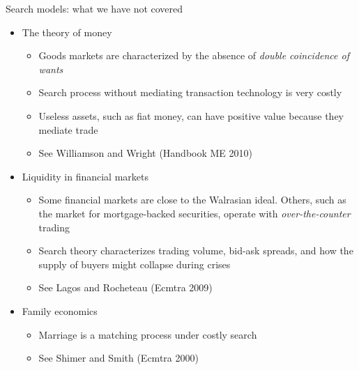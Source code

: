 \documentclass[9pt]{beamer}
\newcommand{\bit}{\begin{itemize}}
\newcommand{\eit}{\end{itemize}}
\begin{document}
\begin{frame}{Search models: what we have not covered}

\bit
\setlength\itemsep{1.5em}

\item The theory of money
\bit
\setlength\itemsep{0.5em}
\item Goods markets are characterized by the absence of \emph{double coincidence of wants}
\item Search process without mediating transaction technology is very costly
\item Useless assets, such as fiat money, can have positive value because they mediate trade
\item See Williamson and Wright (Handbook ME 2010)
\eit

\item Liquidity in financial markets
\bit
\setlength\itemsep{0.5em}
\item Some financial markets are close to the Walrasian ideal. Others, such as the market for mortgage-backed securities, operate with \emph{over-the-counter} trading
\item Search theory characterizes trading volume, bid-ask spreads, and how the supply of buyers might collapse during crises
\item See Lagos and Rocheteau (Ecmtra 2009)
\eit

\item Family economics
\bit
\setlength\itemsep{0.5em}
\item Marriage is a matching process under costly search
\item See Shimer and Smith (Ecmtra 2000)
\eit


\eit

\end{frame}
\end{document}
